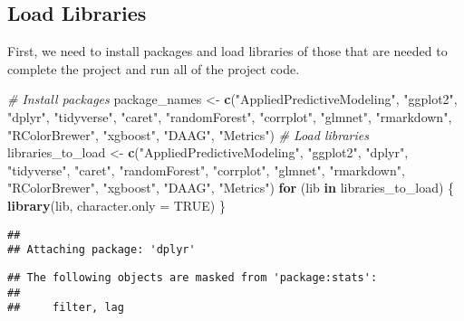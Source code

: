 \documentclass[
]{article}
\newenvironment{Shaded}{\begin{snugshade}}{\end{snugshade}}
\newcommand{\AttributeTok}[1]{\textcolor[rgb]{0.13,0.29,0.53}{#1}}
\newcommand{\CommentTok}[1]{\textcolor[rgb]{0.56,0.35,0.01}{\textit{#1}}}
\newcommand{\ConstantTok}[1]{\textcolor[rgb]{0.56,0.35,0.01}{#1}}
\newcommand{\ControlFlowTok}[1]{\textcolor[rgb]{0.13,0.29,0.53}{\textbf{#1}}}
\newcommand{\FunctionTok}[1]{\textcolor[rgb]{0.13,0.29,0.53}{\textbf{#1}}}
\newcommand{\NormalTok}[1]{#1}
\newcommand{\OtherTok}[1]{\textcolor[rgb]{0.56,0.35,0.01}{#1}}
\newcommand{\StringTok}[1]{\textcolor[rgb]{0.31,0.60,0.02}{#1}}
\begin{document}
\hypertarget{load-libraries}{%
\subsection{Load Libraries}\label{load-libraries}}

First, we need to install packages and load libraries of those that are
needed to complete the project and run all of the project code.

\begin{Shaded}
\begin{Highlighting}[]
\CommentTok{\# Install packages}
\NormalTok{package\_names }\OtherTok{\textless{}{-}} \FunctionTok{c}\NormalTok{(}\StringTok{"AppliedPredictiveModeling"}\NormalTok{, }
                   \StringTok{"ggplot2"}\NormalTok{, }\StringTok{"dplyr"}\NormalTok{, }\StringTok{"tidyverse"}\NormalTok{, }\StringTok{"caret"}\NormalTok{,}
                   \StringTok{"randomForest"}\NormalTok{, }\StringTok{"corrplot"}\NormalTok{, }\StringTok{"glmnet"}\NormalTok{, }\StringTok{"rmarkdown"}\NormalTok{,}
                   \StringTok{"RColorBrewer"}\NormalTok{, }\StringTok{"xgboost"}\NormalTok{, }\StringTok{"DAAG"}\NormalTok{, }\StringTok{"Metrics"}\NormalTok{)}
\CommentTok{\# Load libraries}
\NormalTok{libraries\_to\_load }\OtherTok{\textless{}{-}} \FunctionTok{c}\NormalTok{(}\StringTok{"AppliedPredictiveModeling"}\NormalTok{, }
                       \StringTok{"ggplot2"}\NormalTok{, }\StringTok{"dplyr"}\NormalTok{, }\StringTok{"tidyverse"}\NormalTok{, }\StringTok{"caret"}\NormalTok{,}
                       \StringTok{"randomForest"}\NormalTok{, }\StringTok{"corrplot"}\NormalTok{, }\StringTok{"glmnet"}\NormalTok{, }\StringTok{"rmarkdown"}\NormalTok{,}
                       \StringTok{"RColorBrewer"}\NormalTok{, }\StringTok{"xgboost"}\NormalTok{, }\StringTok{"DAAG"}\NormalTok{, }\StringTok{"Metrics"}\NormalTok{)}
\ControlFlowTok{for}\NormalTok{ (lib }\ControlFlowTok{in}\NormalTok{ libraries\_to\_load) \{}
  \FunctionTok{library}\NormalTok{(lib, }\AttributeTok{character.only =} \ConstantTok{TRUE}\NormalTok{)}
\NormalTok{\}}
\end{Highlighting}
\end{Shaded}

\begin{verbatim}
## 
## Attaching package: 'dplyr'
\end{verbatim}

\begin{verbatim}
## The following objects are masked from 'package:stats':
## 
##     filter, lag
\end{verbatim}
\end{document}

